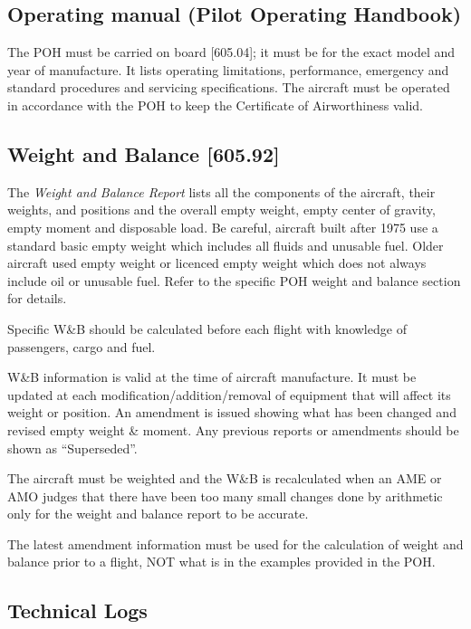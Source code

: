 \documentclass[12pt,letterpaper]{article}
\begin{document}
    \subsection{Operating manual (Pilot Operating Handbook)}
    
    The POH must be carried on board [605.04]; it must be for the exact model and year of manufacture. It lists operating limitations, performance, emergency and standard procedures and servicing specifications. The aircraft must be operated in accordance with the POH to keep the Certificate of Airworthiness valid. 
    
    \subsection{Weight and Balance [605.92]}
    
    The \emph{Weight and Balance Report} lists all the components of the aircraft, their weights, and positions and the overall empty weight, empty center of gravity, empty moment and disposable load. Be careful, aircraft built after 1975 use a standard basic empty weight which includes all fluids and unusable fuel. Older aircraft used empty weight or licenced empty weight which does not always include oil or unusable fuel. Refer to the specific POH weight and balance section for details.
    
    Specific W\&B should be calculated before each flight with knowledge of passengers, cargo and fuel.
    
    W\&B information is valid at the time of aircraft manufacture.  It must be updated at each modification/addition/removal of equipment that will affect its weight or position.  An amendment is issued showing what has been changed and revised empty weight \& moment. Any previous reports or amendments should be shown as “Superseded”.
    
    The aircraft must be weighted and the W\&B is recalculated when an AME or AMO judges that there have been too many small changes done by arithmetic only for the weight and balance report to be accurate.
    
    The latest amendment information must be used for the calculation of weight and balance prior to a flight, NOT what is in the examples provided in the POH.

    \subsection{Technical Logs}
    
\end{document}
